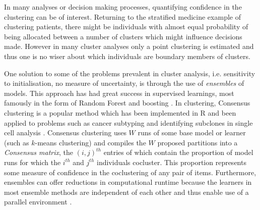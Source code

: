 \documentclass{bioinfo}
\begin{document}
In many analyses or decision making processes, quantifying confidence in the clustering can be of interest. Returning to the stratified medicine example of clustering patients, there might be individuals with almost equal probability of being allocated between a number of clusters which might influence decisions made.
However in many cluster analyses only a point clustering is estimated and thus one is no wiser about which individuals are boundary members of clusters. 

One solution to some of the problems prevalent in cluster analysis, i.e. sensitivity to initialisation, no measure of uncertainty, is through the use of \emph{ensembles} of models. This approach has had great success in supervised learnings, most famously in the form of Random Forest \citep{breiman2001random} and boosting \citep{friedman2002stochastic}. In clustering, Consensus clustering \citep{monti2003consensus} is a popular method which has been implemented in R \citep{wilkerson2010consensusclusterplus} and been applied to problems such as cancer subtyping \citep{lehmann2011identification, verhaak2010integrated} and identifying subclones in single cell analysis \citep{kiselev2017sc3}. Consensus clustering uses $W$ runs of some base model or learner (such as $k$-means clustering) and compiles the $W$ proposed partitions into a \emph{Consensus matrix}, the $(i, j)^{th}$ entries of which contain the proportion of model runs for which the $i^{th}$ and $j^{th}$ individuals cocluster. This proportion represents some measure of confidence in the coclustering of any pair of items. Furthermore, ensembles can offer reductions in computational runtime because the learners in most ensemble methods are independent of each other and thus enable use of a parallel environment  \citep{ghaemi2009survey}. 
\end{document}
